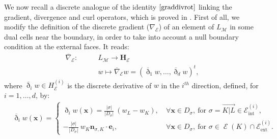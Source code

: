 \documentclass{amsart}
\numberwithin{equation}{section}
\begin{document}
\bigskip
We now recall a discrete analogue of the identity $\eqref{graddivrot}$ linking the gradient, divergence and curl operators, which is proved in \cite{eymard2010convergence}.
First of all, we modify the definition of the discrete gradient ($\nabla_\operatorname{{\mathcal{E}}} $) of an element of $L_{{\mathcal M}} $ in some dual cells near the boundary, in order to take into account a null boundary condition at the external faces.
It reads:
\begin{equation}\label{eq:gradext}
\begin{array}{l|l}
{{\overline \nabla}}_\operatorname{{\mathcal{E}}}:\quad
& \quad
L_{{\mathcal M}} \longrightarrow {{\mathbf{H}_{{\mathcal E}}}}
\\[1ex] & \displaystyle \quad
w \longmapsto {{\overline \nabla}}_\operatorname{{\mathcal{E}}} w = ({\overline \eth}_{1} w , \ldots,  {\overline \eth}_{d} w )^t,
\end{array}
\end{equation}
where ${\overline \eth}_i w \in  {H_{{\mathcal E}}^{(i)}}$ is the discrete derivative of $w$ in the $i^{th}$ direction, defined, for $i= 1,\ldots, d$, by: 
\begin{align}
 \label{discderiveext}
 &\displaystyle
{\overline \eth}_i w({{\boldsymbol x}}) = \begin{cases} \displaystyle
 \eth_i w({{\boldsymbol x}}) =\frac{|{{\sigma}}|}{|D_{{\sigma}}|}\ (w_L - w_K), \ & \forall {{\boldsymbol x}}\in D_{{\sigma}}, \ 
 \mbox{for } {{\sigma}}=\overrightarrow{K|L} \in {{\mathcal E}_{\mathrm{int}}^{(i)}}, \\[2ex] \displaystyle
 -\frac{|{{\sigma}}|}{|D_{{\sigma}}|}\ w_K{\bm{n}}_{{{\sigma}},K} \cdot \bm{e}_i, \ & \forall {{\boldsymbol x}}\in D_{{\sigma}}, \ 
 \mbox{for } {{\sigma}}  \in \operatorname{{\mathcal{E}}}(K) \cap {{\mathcal E}_{\mathrm{ext}}^{(i)}}. 
\end{cases}
\end{align}

\medskip
\end{document}
